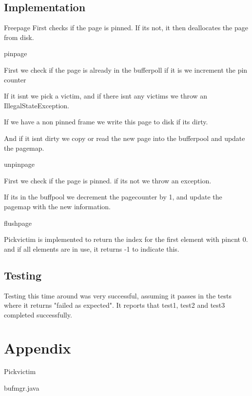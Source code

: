 \documentclass[a4paper,10pt,titlepage]{report}
\begin{document}
\subsection{Implementation}
Freepage First checks if the page is pinned. If its not, it then deallocates the page from disk.

\vspace{10mm}
pinpage

First we check if the page is already in the bufferpoll if it is we increment the pin counter

If it isnt we pick a victim, and if there isnt any victims we throw an IllegalStateException.

If we have a non pinned frame we write this page to disk if its dirty.

And if it isnt dirty we  copy or read the new page into the bufferpool and update the pagemap.

\vspace{10mm}
unpinpage

First we check if the page is pinned. if its not we throw an exception.

If its in the buffpool we decrement the pagecounter by 1, and update the pagemap with the new information.

\vspace{10mm}
flushpage

\vspace{10mm}

Pickvictim is implemented to return the index for the first element with pincnt 0. and if all elements are in use, it returns -1 to indicate this.


\subsection{Testing}
Testing this time around was very successful, assuming it passes in the tests where it returns "failed as expected". It reports that test1, test2 and test3 completed successfully.

\section{Appendix}
Pickvictim


bufmgr.java

\end{document}
